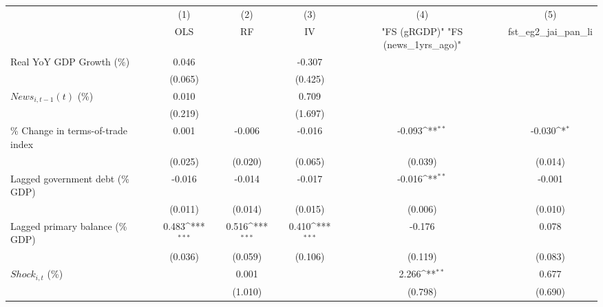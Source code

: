 {
\def\sym#1{\ifmmode^{#1}\else\(^{#1}\)\fi}
\begin{tabular}{l*{5}{c}}
\toprule
                    &\multicolumn{1}{c}{(1)}&\multicolumn{1}{c}{(2)}&\multicolumn{1}{c}{(3)}&\multicolumn{1}{c}{(4)}&\multicolumn{1}{c}{(5)}\\
                    &\multicolumn{1}{c}{OLS}&\multicolumn{1}{c}{RF}&\multicolumn{1}{c}{IV}&\multicolumn{1}{c}{ "FS (gRGDP)"  "FS (news_1yrs_ago)" }&\multicolumn{1}{c}{fst_eg2_jai_pan_li}\\
\midrule
Real YoY GDP Growth (\%)&       0.046         &                     &      -0.307         &                     &                     \\
                    &     (0.065)         &                     &     (0.425)         &                     &                     \\
\addlinespace
$ News_{i,t-1}(t)$ (\%)&       0.010         &                     &       0.709         &                     &                     \\
                    &     (0.219)         &                     &     (1.697)         &                     &                     \\
\addlinespace
\% Change in terms-of-trade index&       0.001         &      -0.006         &      -0.016         &      -0.093\sym{**} &      -0.030\sym{*}  \\
                    &     (0.025)         &     (0.020)         &     (0.065)         &     (0.039)         &     (0.014)         \\
\addlinespace
Lagged government debt (\% GDP)&      -0.016         &      -0.014         &      -0.017         &      -0.016\sym{**} &      -0.001         \\
                    &     (0.011)         &     (0.014)         &     (0.015)         &     (0.006)         &     (0.010)         \\
\addlinespace
Lagged primary balance (\% GDP)&       0.483\sym{***}&       0.516\sym{***}&       0.410\sym{***}&      -0.176         &       0.078         \\
                    &     (0.036)         &     (0.059)         &     (0.106)         &     (0.119)         &     (0.083)         \\
\addlinespace
$ Shock_{i,t}$ (\%) &                     &       0.001         &                     &       2.266\sym{**} &       0.677         \\
                    &                     &     (1.010)         &                     &     (0.798)         &     (0.690)         \\

\end{tabular}}
